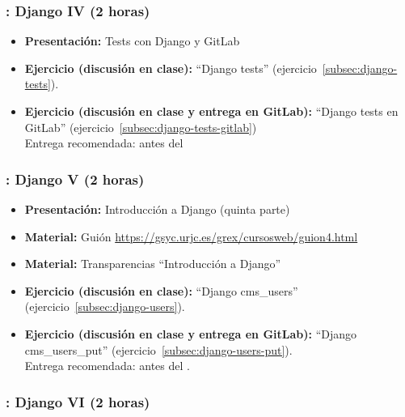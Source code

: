 \documentclass[a4paper,12pt]{article}
\begin{document}
\subsubsection{\juevesJ: Django IV (2 horas)}
\label{cal:juevesJ}

\begin{itemize}
\item \textbf{Presentación:} Tests con Django y GitLab
\item \textbf{Ejercicio (discusión en clase):} ``Django tests'' (ejercicio~\ref{subsec:django-tests}).
\item \textbf{Ejercicio (discusión en clase y entrega en GitLab):} ``Django tests en GitLab'' (ejercicio~\ref{subsec:django-tests-gitlab}) \\
  Entrega recomendada: antes del \juevesK
\end{itemize}


\subsubsection{\juevesK: Django V (2 horas)}
\label{cal:juevesK}

\begin{itemize}
 \item \textbf{Presentación:} Introducción a Django (quinta parte)
 \item \textbf{Material:} Guión \url{https://gsyc.urjc.es/grex/cursosweb/guion4.html}
 \item \textbf{Material:} Transparencias ``Introducción a Django''
 \item \textbf{Ejercicio (discusión en clase):} ``Django cms\_users'' (ejercicio~\ref{subsec:django-users}).
 \item \textbf{Ejercicio (discusión en clase y entrega en GitLab):} ``Django cms\_users\_put'' (ejercicio~\ref{subsec:django-users-put}). \\
  Entrega recomendada: antes del \juevesL.
\end{itemize}

\subsubsection{\juevesL: Django VI (2 horas)}
\label{cal:juevesL}
\end{document}
